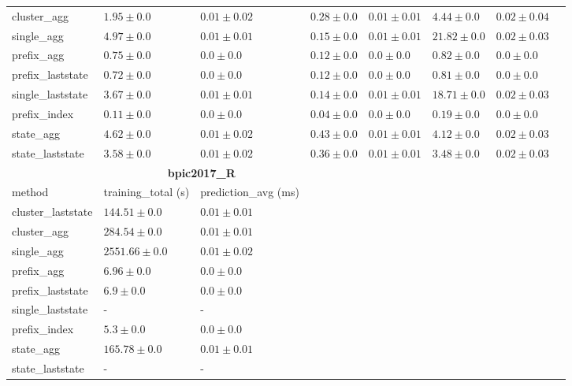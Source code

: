 \documentclass[twoside,11pt]{Latex/Classes/PhDthesisPSnPDF}
\begin{document}
\begin{table}[!htbp]
{\begin{tabular}{llllllll}
					cluster\_agg & $1.95 \pm 0.0$ & $0.01 \pm 0.02$ & $0.28 \pm 0.0$ & $0.01 \pm 0.01$ & $4.44 \pm 0.0$ & $0.02 \pm 0.04$ \\ 
					single\_agg & $4.97 \pm 0.0$ & $0.01 \pm 0.01$ & $0.15 \pm 0.0$ & $0.01 \pm 0.01$ & $21.82 \pm 0.0$ & $0.02 \pm 0.03$ \\ 
					prefix\_agg & $0.75 \pm 0.0$ & $\mathbf{0.0 \pm 0.0}$ & $0.12 \pm 0.0$ & $\mathbf{0.0 \pm 0.0}$ & $0.82 \pm 0.0$ & $\mathbf{0.0 \pm 0.0}$ \\ 
					prefix\_laststate & $0.72 \pm 0.0$ & $\mathbf{0.0 \pm 0.0}$ & $0.12 \pm 0.0$ & $\mathbf{0.0 \pm 0.0}$ & $0.81 \pm 0.0$ & $\mathbf{0.0 \pm 0.0}$ \\ 
					single\_laststate & $3.67 \pm 0.0$ & $0.01 \pm 0.01$ & $0.14 \pm 0.0$ & $0.01 \pm 0.01$ & $18.71 \pm 0.0$ & $0.02 \pm 0.03$ \\ 
					prefix\_index & $\mathbf{0.11 \pm 0.0}$ & $\mathbf{0.0 \pm 0.0}$ & $\mathbf{0.04 \pm 0.0}$ & $\mathbf{0.0 \pm 0.0}$ & $\mathbf{0.19 \pm 0.0}$ & $\mathbf{0.0 \pm 0.0}$ \\ 
					state\_agg & $4.62 \pm 0.0$ & $0.01 \pm 0.02$ & $0.43 \pm 0.0$ & $0.01 \pm 0.01$ & $4.12 \pm 0.0$ & $0.02 \pm 0.03$ \\ 
					state\_laststate & $3.58 \pm 0.0$ & $0.01 \pm 0.02$ & $0.36 \pm 0.0$ & $0.01 \pm 0.01$ & $3.48 \pm 0.0$ & $0.02 \pm 0.03$ \\ 
					\bottomrule
					\toprule
					& \multicolumn{2}{c}{{\bfseries bpic2017\_R}} \\ \cmidrule(lr){2-3} \cmidrule(lr){4-5} \cmidrule(lr){6-7}
					method  & training\_total (s) & prediction\_avg (ms) \\ \midrule
					cluster\_laststate & $144.51 \pm 0.0$ & $0.01 \pm 0.01$ \\ 
					cluster\_agg & $284.54 \pm 0.0$ & $0.01 \pm 0.01$ \\ 
					single\_agg & $2551.66 \pm 0.0$ & $0.01 \pm 0.02$ \\ 
					prefix\_agg & $6.96 \pm 0.0$ & $\mathbf{0.0 \pm 0.0}$ \\ 
					prefix\_laststate & $6.9 \pm 0.0$ & $\mathbf{0.0 \pm 0.0}$ \\ 
					single\_laststate & - & - \\ 
					prefix\_index & $\mathbf{5.3 \pm 0.0}$ & $\mathbf{0.0 \pm 0.0}$ \\ 
					state\_agg & $165.78 \pm 0.0$ & $0.01 \pm 0.01$ \\ 
					state\_laststate & - & - \\ 
					\bottomrule
					
			
		\end{tabular}%
	}
	
	
\end{table}
\end{document}
